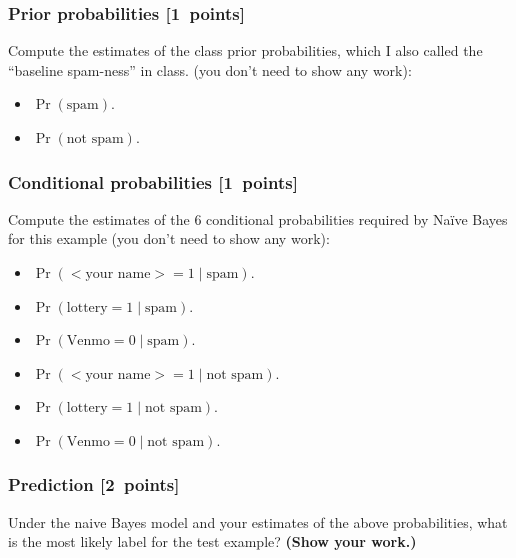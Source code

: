 \documentclass{article}
\newcommand{\blu}[1]{{\textcolor{blu}{#1}}}
\let\ask\blu
\newcommand\pts[1]{\textcolor{pointscolour}{[#1~points]}}
\begin{document}
    \subsubsection{Prior probabilities \pts{1}}
    \ask{Compute the estimates of the class prior probabilities, which I also called the ``baseline spam-ness'' in class.} (you don't need to show any work):
    \begin{itemize}
        \item $\Pr(\text{spam})$.
        \item $\Pr(\text{not spam})$.
    \end{itemize}

    \subsubsection{Conditional probabilities \pts{1}}

    \ask{Compute the estimates of the 6 conditional probabilities required by Na\"ive Bayes for this example}  (you don't need to show any work):
    \begin{itemize}
        \item $\Pr(\text{$<$your name$>$} = 1  \mid \text{spam})$.
        \item $\Pr(\text{lottery} = 1 \mid \text{spam})$.
        \item $\Pr(\text{Venmo} = 0  \mid \text{spam})$.
        \item $\Pr(\text{$<$your name$>$} = 1  \mid \text{not spam})$.
        \item $\Pr(\text{lottery} = 1  \mid \text{not spam})$.
        \item $\Pr(\text{Venmo} = 0  \mid \text{not spam})$.
    \end{itemize}

    \subsubsection{Prediction \pts{2}}

    \ask{Under the naive Bayes model and your estimates of the above probabilities, what is the most likely label for the test example? \textbf{(Show your work.)}}
\end{document}

